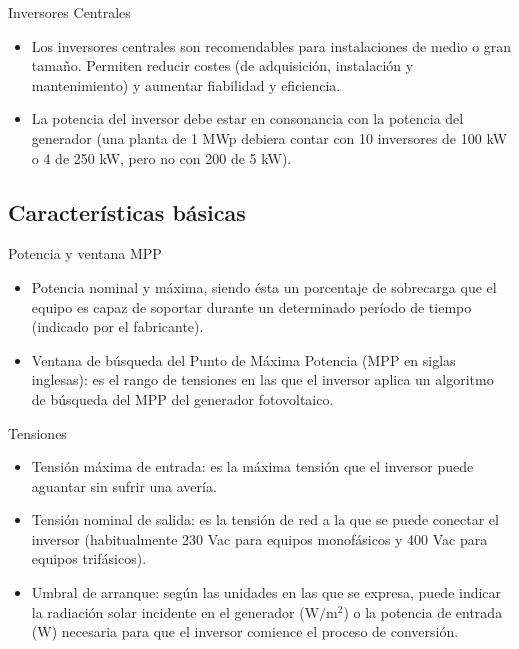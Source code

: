 \documentclass[xcolor={usenames,svgnames,dvipsnames}]{beamer}
\begin{document}
\begin{frame}[label=sec-2-2-3]{Inversores Centrales}
\begin{itemize}
\item Los \alert{inversores centrales} son recomendables para instalaciones de
medio o gran tamaño. Permiten reducir costes (de adquisición,
instalación y mantenimiento) y aumentar fiabilidad y eficiencia.

\item \alert{La potencia del inversor debe estar en consonancia con la potencia
del generador} (una planta de 1 MWp debiera contar con 10 inversores
de 100 kW o 4 de 250 kW, pero no con 200 de 5 kW).
\end{itemize}
\end{frame}

\subsection{Características básicas}
\label{sec-2-3}
\begin{frame}[label=sec-2-3-1]{Potencia y ventana MPP}
\begin{itemize}
\item \alert{Potencia nominal y máxima}, siendo ésta un porcentaje de sobrecarga
que el equipo es capaz de soportar durante un determinado período de
tiempo (indicado por el fabricante).

\item \alert{Ventana de búsqueda del Punto de Máxima Potencia} (MPP en siglas
inglesas): es el rango de tensiones en las que el inversor aplica un
algoritmo de búsqueda del MPP del generador fotovoltaico.
\end{itemize}
\end{frame}

\begin{frame}[label=sec-2-3-2]{Tensiones}
\begin{itemize}
\item \alert{Tensión máxima de entrada}: es la máxima tensión que el inversor
puede aguantar sin sufrir una avería.

\item \alert{Tensión nominal de salida}: es la tensión de red a la que se puede
conectar el inversor (habitualmente 230 Vac para equipos monofásicos
y 400 Vac para equipos trifásicos).

\item \alert{Umbral de arranque}: según las unidades en las que se expresa, puede
indicar la radiación solar incidente en el generador
($\si{\watt\per\meter\squared}$) o la potencia de entrada (W)
necesaria para que el inversor comience el proceso de conversión.
\end{itemize}
\end{frame}
\end{document}
